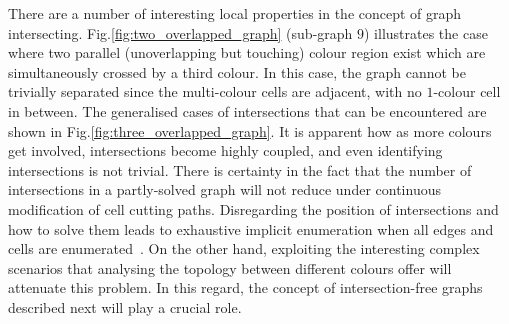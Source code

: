 \documentclass[conference]{IEEEtran}
\begin{document}
There are a number of interesting local properties in the concept of graph intersecting. 
Fig.\ref{fig:two_overlapped_graph} (sub-graph $9$) illustrates the case where two parallel (unoverlapping but touching) colour region exist which are simultaneously crossed by a third colour. In this case, the graph cannot be trivially separated since the multi-colour cells are adjacent, with no $1$-colour cell in between. The generalised cases of intersections that can be encountered are shown in Fig.\ref{fig:three_overlapped_graph}. 
It is apparent how as more colours get involved, %
intersections become highly coupled, and even identifying intersections is not trivial. 
There is certainty in the fact that the number of intersections in a partly-solved graph will not reduce under continuous modification of cell cutting paths. 
Disregarding the position of intersections and how to solve them leads to exhaustive implicit enumeration when all edges and cells are enumerated~\cite{Yang2020Cellular}. 
On the other hand, exploiting the interesting complex scenarios that analysing the topology between different colours offer will attenuate this problem. In this regard, the concept of intersection-free graphs described next will play a crucial role.  
\end{document}
